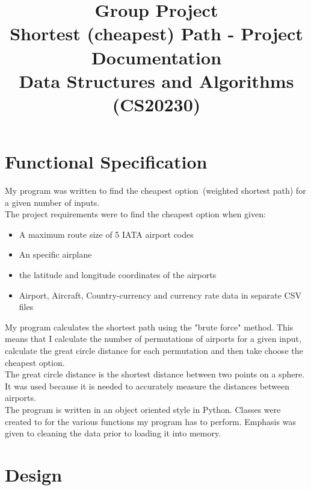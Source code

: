 \documentclass[oneside]{article}
\title{Group Project \\ Shortest (cheapest) Path - Project Documentation \\Data Structures and Algorithms (CS20230)}
\begin{document}
\maketitle


\section{Functional Specification}


My program was written to find the cheapest option (weighted shortest path) for a given number of inputs.\\

The project requirements were to find the cheapest option when given:
\begin{itemize}[nosep]
\item A maximum route size of 5 IATA airport codes
\item An specific airplane
\item the latitude and longitude coordinates of the airports
\item Airport, Aircraft, Country-currency and currency rate data in separate CSV files
\end{itemize}

My program calculates the shortest path using the "brute force" method. This means that I calculate the number of permutations of airports for a given input, calculate the great circle distance for each permutation and then take choose the cheapest option.\\

The great circle distance is the shortest distance between two points on a sphere. It was used because it is needed to accurately measure the distances between airports.\\

The program is written in an object oriented style in Python. Classes were created to for the various functions my program has to perform. Emphasis was given to cleaning the data prior to loading it into memory.\\


\section{Design}
\end{document}
